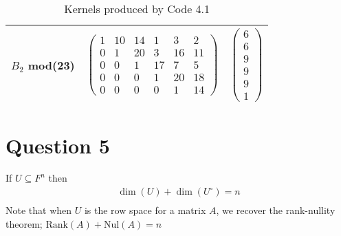 \documentclass[10pt,a4paper,notitlepage]{article}
\newcommand{\Rank}{\text{Rank}}
\newcommand{\Nul}{\text{Nul}}
\begin{document}
\begin{table}[H]
\begin{tabular}{|c|c|c|}
\hline
$B_{2}$ mod(23) & $\begin{pmatrix} 1 & 10 & 14 & 1 & 3 & 2\\ 0 & 1 & 20 & 3 & 16 & 11\\ 0 & 0 & 1 & 17 & 7 & 5\\ 0 & 0 & 0 & 1 & 20 & 18\\ 0 & 0 & 0 & 0 & 1 & 14 \end{pmatrix}$&$\begin{pmatrix}
6\\6\\9\\9\\9\\1\end{pmatrix}$\\
\hline
\end{tabular}
\caption{Kernels produced by Code 4.1}
\label{Kernel}
\end{table}
\section*{\centering \large Question 5}
If $U\subseteq F^{n}$ then
\begin{equation}
\begin{aligned}
\dim(U)+\dim(U^{\circ})=n \\
\end{aligned}
\end{equation}
Note that when $U$ is the row space for a matrix $A$, we recover the rank-nullity theorem; $\Rank(A)+\Nul(A)=n$
\end{document}
